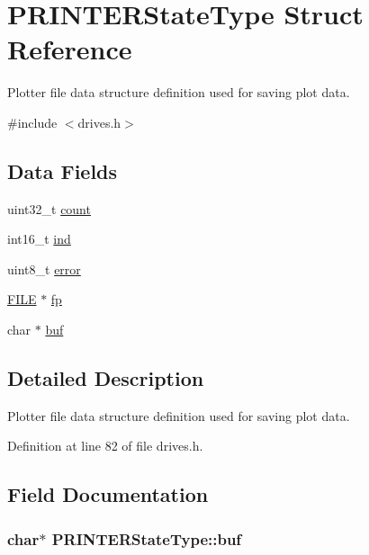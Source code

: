 \hypertarget{structPRINTERStateType}{}\section{P\+R\+I\+N\+T\+E\+R\+State\+Type Struct Reference}
\label{structPRINTERStateType}


Plotter file data structure definition used for saving plot data.  




{\ttfamily \#include $<$drives.\+h$>$}

\subsection*{Data Fields}
\begin{DoxyCompactItemize}
\item 
uint32\+\_\+t \hyperlink{structPRINTERStateType_ae115fc351910f3801e37b31f254fb8f4}{count}
\item 
int16\+\_\+t \hyperlink{structPRINTERStateType_a7d8873d0011f31d7dd00c2b7e0d362bd}{ind}
\item 
uint8\+\_\+t \hyperlink{structPRINTERStateType_a6e5b550f5396901febd5475445132dd0}{error}
\item 
\hyperlink{posix_8h_aed4dabeb9f7c518ded42f930a04abce8}{F\+I\+LE} $\ast$ \hyperlink{structPRINTERStateType_a791c78d68d169f9d2e60d34b890e520a}{fp}
\item 
char $\ast$ \hyperlink{structPRINTERStateType_aa48220761aa3c77c954a55f09388c615}{buf}
\end{DoxyCompactItemize}


\subsection{Detailed Description}
Plotter file data structure definition used for saving plot data. 

Definition at line 82 of file drives.\+h.



\subsection{Field Documentation}
\subsubsection[{\texorpdfstring{buf}{buf}}]{\setlength{\rightskip}{0pt plus 5cm}char$\ast$ P\+R\+I\+N\+T\+E\+R\+State\+Type\+::buf}\hypertarget{structPRINTERStateType_aa48220761aa3c77c954a55f09388c615}{}\label{structPRINTERStateType_aa48220761aa3c77c954a55f09388c615}


